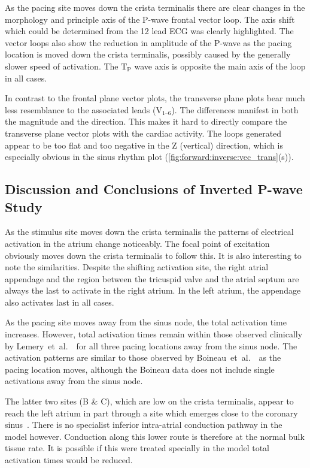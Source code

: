 As the pacing site moves down the crista terminalis there are clear changes in
the morphology and principle axis of the P-wave frontal vector loop.
The axis shift which could be determined from the 12 lead ECG was clearly
highlighted.
The vector loops also show the reduction in amplitude of the P-wave as the
pacing location is moved down the crista terminalis, possibly caused by the
generally slower speed of activation.
The $\text{T}_{\text{P}}$ wave axis is opposite the main axis of the loop in all
cases.

In contrast to the frontal plane vector plots, the transverse plane plots bear
much less resemblance to the associated leads ($\text{V}_{\text{1--6}}$).
The differences manifest in both the magnitude and the direction.
This makes it hard to directly compare the transverse plane vector plots with
the cardiac activity.
The loops generated appear to be too flat and too negative in the Z (vertical)
direction, which is especially obvious in the sinus rhythm plot
(\ref{fig:forward:inverse:vec_trans}(s)).

\subsection{Discussion and Conclusions of Inverted P-wave Study}

As the stimulus site moves down the crista terminalis the patterns of electrical
activation in the atrium change noticeably.
The focal point of excitation obviously moves down the crista terminalis to
follow this.
It is also interesting to note the similarities.
Despite the shifting activation site, the right atrial appendage and the region
between the tricuspid valve and the atrial septum are always the last to
activate in the right atrium.
In the left atrium, the appendage also activates last in all cases.

As the pacing site moves away from the sinus node, the total activation time
increases.
However, total activation times remain within those observed clinically by
Lemery~et~al.~\cite{Lemery2004}\ for all three pacing locations away from the
sinus node.
The activation patterns are similar to those observed by
Boineau~et~al.~\cite{Boineau1988}\ as the pacing location moves, although the
Boineau data does not include single activations away from the sinus node.

The latter two sites (B \& C), which are low on the crista terminalis, appear to
reach the left atrium in part through a site which emerges close to the coronary
sinus~\cite{Platonov2007,Platonov2008,Markides2003,Lemery2004}.
There is no specialist inferior intra-atrial conduction pathway in the model
however.
Conduction along this lower route is therefore at the normal bulk tissue rate.
It is possible if this were treated specially in the model total activation
times would be reduced.


